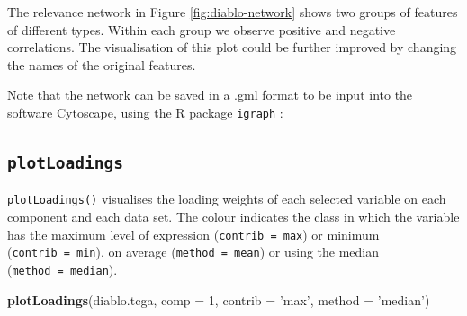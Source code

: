 \documentclass[]{book}
\newenvironment{Shaded}{\begin{snugshade}}{\end{snugshade}}
\newcommand{\CommentTok}[1]{\textcolor[rgb]{0.56,0.35,0.01}{\textit{#1}}}
\newcommand{\DataTypeTok}[1]{\textcolor[rgb]{0.13,0.29,0.53}{#1}}
\newcommand{\DecValTok}[1]{\textcolor[rgb]{0.00,0.00,0.81}{#1}}
\newcommand{\FloatTok}[1]{\textcolor[rgb]{0.00,0.00,0.81}{#1}}
\newcommand{\KeywordTok}[1]{\textcolor[rgb]{0.13,0.29,0.53}{\textbf{#1}}}
\newcommand{\NormalTok}[1]{#1}
\newcommand{\OperatorTok}[1]{\textcolor[rgb]{0.81,0.36,0.00}{\textbf{#1}}}
\newcommand{\StringTok}[1]{\textcolor[rgb]{0.31,0.60,0.02}{#1}}
\begin{document}
The relevance network in Figure \ref{fig:diablo-network} shows two groups of features of different types. Within each group we observe positive and negative correlations. The visualisation of this plot could be further improved by changing the names of the original features.

Note that the network can be saved in a .gml format to be input into the software Cytoscape, using the R package \texttt{igraph} \citep{csa06}:

\begin{Shaded}
\end{Shaded}

\hypertarget{plotloadings}{%
\subsection{\texorpdfstring{\texttt{plotLoadings}}{plotLoadings}}\label{plotloadings}}

\texttt{plotLoadings()} visualises the loading weights of each selected variable on each component and each data set. The colour indicates the class in which the variable has the maximum level of expression (\texttt{contrib\ =\ \textquotesingle{}max\textquotesingle{}}) or minimum (\texttt{contrib\ =\ \textquotesingle{}min\textquotesingle{}}), on average (\texttt{method\ =\ \textquotesingle{}mean\textquotesingle{}}) or using the median (\texttt{method\ =\ \textquotesingle{}median\textquotesingle{}}).

\begin{Shaded}
\begin{Highlighting}[]
\KeywordTok{plotLoadings}\NormalTok{(diablo.tcga, }\DataTypeTok{comp =} \DecValTok{1}\NormalTok{, }\DataTypeTok{contrib =} \StringTok{'max'}\NormalTok{, }\DataTypeTok{method =} \StringTok{'median'}\NormalTok{)}
\end{Highlighting}
\end{Shaded}
\end{document}

